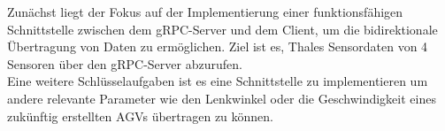 Zunächst liegt der Fokus auf der Implementierung einer funktionsfähigen Schnittstelle zwischen dem gRPC-Server und dem Client, um die bidirektionale Übertragung von Daten zu ermöglichen. Ziel ist es, Thales Sensordaten von 4 Sensoren über den gRPC-Server abzurufen.\\

Eine weitere Schlüsselaufgaben ist es eine Schnittstelle zu implementieren um andere relevante Parameter wie den Lenkwinkel oder die Geschwindigkeit eines zukünftig erstellten AGVs übertragen zu können.\\




